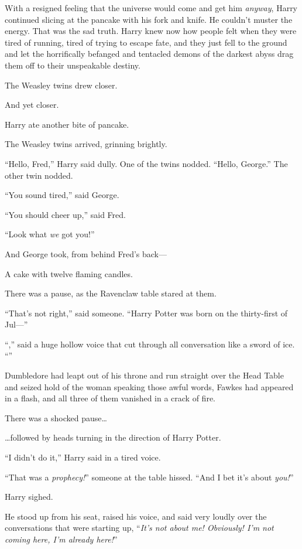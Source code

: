 With a resigned feeling that the universe would come and get him \emph{anyway}, Harry continued slicing at the pancake with his fork and knife. He couldn’t muster the energy. That was the sad truth. Harry knew now how people felt when they were tired of running, tired of trying to escape fate, and they just fell to the ground and let the horrifically befanged and tentacled demons of the darkest abyss drag them off to their unspeakable destiny.

The Weasley twins drew closer.

And yet closer.

Harry ate another bite of pancake.

The Weasley twins arrived, grinning brightly.

“Hello, Fred,” Harry said dully. One of the twins nodded. “Hello, George.” The other twin nodded.

“You sound tired,” said George.

“You should cheer up,” said Fred.

“Look what \emph{we} got you!”

And George took, from behind Fred’s back—

A cake with twelve flaming candles.

There was a pause, as the Ravenclaw table stared at them.

“That’s not right,” said someone. “Harry Potter was born on the thirty-first of Jul—”

“,” said a huge hollow voice that cut through all conversation like a sword of ice. “”

Dumbledore had leapt out of his throne and run straight over the Head Table and seized hold of the woman speaking those awful words, Fawkes had appeared in a flash, and all three of them vanished in a crack of fire.

There was a shocked pause…

…followed by heads turning in the direction of Harry Potter.

“I didn’t do it,” Harry said in a tired voice.

“That was a \emph{prophecy!}” someone at the table hissed. “And I bet it’s about \emph{you!}”

Harry sighed.

He stood up from his seat, raised his voice, and said very loudly over the conversations that were starting up, “\emph{It’s not about me! Obviously! I’m not coming here, I’m already here!}”

